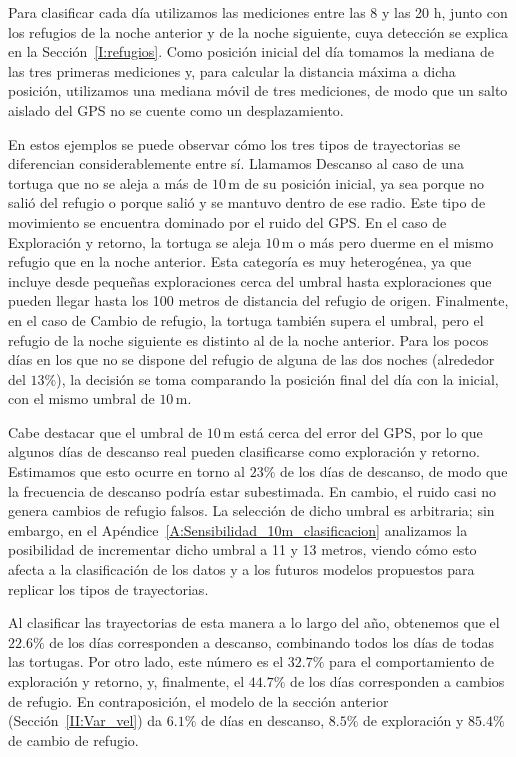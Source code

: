 Para clasificar cada día utilizamos las mediciones entre las 8 y las 20 h, junto con los refugios de la noche anterior y de la noche siguiente, cuya detección se 
explica en la Sección~\ref{I:refugios}. Como posición inicial del día tomamos la mediana de las tres primeras mediciones y, para calcular la distancia máxima a dicha 
posición, utilizamos una mediana móvil de tres mediciones, de modo que un salto aislado del GPS no se cuente como un desplazamiento.

En estos ejemplos se puede observar cómo los tres tipos de trayectorias se diferencian considerablemente entre sí. Llamamos Descanso al caso de una tortuga que no se 
aleja a más de $10\,\mathrm{m}$ de su posición inicial, ya sea porque no salió del refugio o porque salió y se mantuvo dentro de ese radio. Este tipo de movimiento se 
encuentra dominado por el ruido del GPS. En el caso de Exploración y retorno, la tortuga se aleja $10\,\mathrm{m}$ o más pero duerme en el mismo refugio que en la 
noche anterior. Esta categoría es muy heterogénea, ya que incluye desde pequeñas exploraciones cerca del umbral hasta exploraciones que pueden llegar hasta los 
100 metros de distancia del refugio de origen. Finalmente, en el caso de Cambio de refugio, la tortuga también supera el umbral, pero el refugio de la noche 
siguiente es distinto al de la noche anterior. Para los pocos días en los que no se dispone del refugio de alguna de las dos noches 
(alrededor del $13\%$), la decisión se toma comparando la posición final del día con la inicial, con el mismo umbral de $10\,\mathrm{m}$.

Cabe destacar que el umbral de $10\,\mathrm{m}$ está cerca del error del GPS, por lo que algunos días de descanso real pueden clasificarse como exploración y retorno. 
Estimamos que esto ocurre en torno al $23\%$ de los días de descanso, de modo que la frecuencia de descanso podría estar subestimada. 
En cambio, el ruido casi no genera cambios de refugio falsos. La selección de dicho umbral es arbitraria; sin embargo, en el 
Apéndice~\ref{A:Sensibilidad_10m_clasificacion} analizamos la posibilidad de incrementar dicho umbral a 11 y 13 metros, viendo cómo esto afecta
a la clasificación de los datos y a los futuros modelos propuestos para replicar los tipos de trayectorias.

Al clasificar las trayectorias de esta manera a lo largo del año, obtenemos que el $22.6\%$ de los días corresponden a descanso, combinando todos los días de todas 
las tortugas. Por otro lado, este número es el $32.7\%$ para el comportamiento de exploración y retorno, y, finalmente, el $44.7\%$ de los días corresponden a 
cambios de refugio. En contraposición, el modelo de la sección anterior (Sección~\ref{II:Var_vel}) da $6.1 \%$ de días en descanso, 
$8.5 \%$ de exploración y $85.4 \%$ de cambio de refugio.

